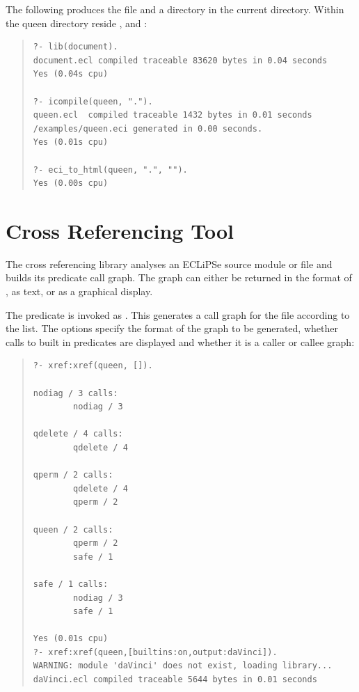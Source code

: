 The following produces the  file and a 
directory in the current directory. Within the queen directory reside
,  and :
\begin{quote}
\begin{verbatim}
?- lib(document).
document.ecl compiled traceable 83620 bytes in 0.04 seconds
Yes (0.04s cpu)

?- icompile(queen, ".").
queen.ecl  compiled traceable 1432 bytes in 0.01 seconds
/examples/queen.eci generated in 0.00 seconds.
Yes (0.01s cpu)

?- eci_to_html(queen, ".", "").
Yes (0.00s cpu)
\end{verbatim}
\end{quote}

\section{Cross Referencing Tool}

The cross referencing library  analyses an ECLiPSe source
module or file and builds its predicate call graph. The graph can either
be returned in the format of , as text, or
as a graphical display.

The  predicate is invoked
as . This generates
a call graph for the file  according to the 
list.  The options specify the format of the graph to be generated, whether
calls to built in predicates are displayed and whether it is a caller
or callee graph:
\begin{quote}
\begin{verbatim}
?- xref:xref(queen, []).

nodiag / 3 calls:
        nodiag / 3

qdelete / 4 calls:
        qdelete / 4

qperm / 2 calls:
        qdelete / 4
        qperm / 2

queen / 2 calls:
        qperm / 2
        safe / 1

safe / 1 calls:
        nodiag / 3
        safe / 1

Yes (0.01s cpu)
?- xref:xref(queen,[builtins:on,output:daVinci]).
WARNING: module 'daVinci' does not exist, loading library...
daVinci.ecl compiled traceable 5644 bytes in 0.01 seconds
\end{verbatim}
\end{quote}


